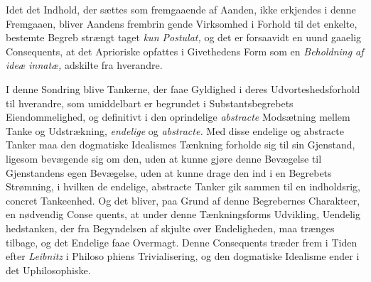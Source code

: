 Idet det Indhold, der sættes som fremgaaende af Aanden,
ikke erkjendes i denne Fremgaaen, bliver Aandens frembrin\-%
gende Virksomhed i Forhold til det enkelte, bestemte Begreb
strængt taget \emph{kun Postulat,} og det er forsaavidt en uund\-%
gaaelig Consequents, at det Aprioriske opfattes i Givethedens
Form som en \emph{Beholdning af ideæ innatæ,} adskilte fra
hverandre.

I denne Sondring blive Tankerne, der faae Gyldighed i
deres Udvorteshedsforhold til hverandre, som umiddelbart er
begrundet i Substantsbegrebets Eiendommelighed, og definitivt i
den oprindelige \emph{abstracte} Modsætning mellem Tanke og
Udstrækning, \emph{endelige} og \emph{abstracte.} Med disse endelige
og abstracte Tanker maa den dogmatiske Idealismes Tænkning
forholde sig til sin Gjenstand, ligesom bevægende sig om den,
uden at kunne gjøre denne Bevægelse til Gjenstandens egen
Bevægelse, uden at kunne drage den ind i en Begrebets
Strømning, i hvilken de endelige, abstracte Tanker gik sammen
til en indholdsrig, concret Tankeenhed. Og det bliver, paa
Grund af denne Begrebernes Charakteer, en nødvendig Conse\-%
quents, at under denne Tænkningsforms Udvikling, Uendelig\-%
hedstanken, der fra Begyndelsen af skjulte over Endeligheden,
maa trænges tilbage, og det Endelige faae Overmagt. Denne
Consequents træder frem i Tiden efter \emph{Leibnitz} i Philoso\-%
phiens Trivialisering, og den dogmatiske Idealisme ender i
det Uphilosophiske.

